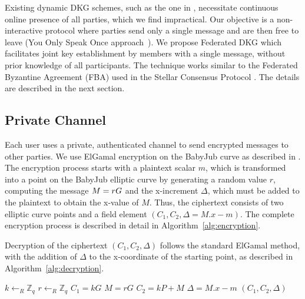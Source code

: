 \documentclass[runningheads]{llncs}
\begin{document}
Existing dynamic DKG schemes, such as the one in \cite{delerableeDynamicThresholdPublickey2008}, necessitate continuous online presence of all parties, which we find impractical. Our objective is a non-interactive protocol where parties send only a single message and are then free to leave (You Only Speak Once approach~\cite{gentryYOSOYouOnly2021}). We propose Federated DKG which facilitates joint key establishment by members with a single message, without prior knowledge of all participants.
The technique works similar to the Federated Byzantine Agreement (FBA) used in the Stellar Consensus Protocol \cite{mazieresStellarConsensusProtocol2015}. The details are described in the next section.


\subsection{Private Channel}\label{private-channel}
Each user uses a private, authenticated channel to send encrypted messages to other parties. We use ElGamal encryption on the BabyJub curve as described in \cite{ElGamalEncryptionDecryption2020,jieWeijiekohElgamalbabyjub2023}. The encryption process starts with a plaintext scalar $m$, which is transformed into a point on the BabyJub elliptic curve by generating a random value $r$, computing the message $M=rG$ and the x-increment $\Delta$, which must be added to the plaintext to obtain the x-value of $M$. Thus, the ciphertext consists of two elliptic curve points and a field element $(C_1, C_2, \Delta=M.x - m)$. The complete encryption process is described in detail in Algorithm~\ref{alg:encryption}.

Decryption of the ciphertext $(C_1, C_2, \Delta)$ follows the standard ElGamal method, with the addition of $\Delta$ to the x-coordinate of the starting point, as described in Algorithm~\ref{alg:decryption}.

\begin{algorithm}
    \caption{$\texttt{Enc}_{P_i}$}
    \label{alg:encryption}
    
    
    $k \gets_R \mathbb{Z}_q$\;
    $r \gets_R \mathbb{Z}_q$\;
    $C_1 = kG$\;
    $M = rG$\;
    $C_2 = kP + M$\;
    $\Delta = M.x - m$\;
    \Return $(C_1, C_2, \Delta)$
\end{algorithm}
\end{document}
